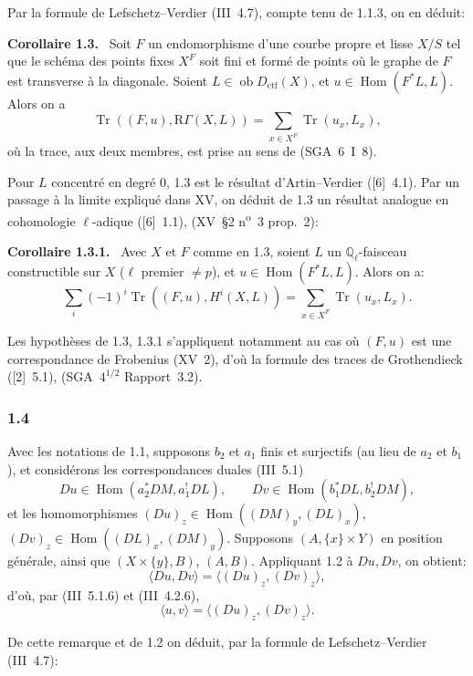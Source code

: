 \documentclass[11pt]{article}
\newenvironment{statement}[1]{\par\medskip\noindent\textbf{#1.}\ }{\par\medskip}
\DeclareMathOperator{\Hom}{Hom}
\newcommand{\R}{\mathrm{R}}\newcommand{\RHomCore}{\mathrm{RHom}}
\newcommand{\ob}{\operatorname{ob}}
\providecommand{\ctf}{\mathrm{ctf}}
\providecommand{\Tr}{\operatorname{Tr}}
\providecommand{\Tr}{\operatorname{Tr}}
\providecommand{\Tr}{\operatorname{Tr}}
\providecommand{\Hom}{\operatorname{Hom}}
\providecommand{\ob}{\operatorname{ob}}
\providecommand{\R}{\mathrm R}
\providecommand{\Tr}{\operatorname{Tr}}
\providecommand{\Hom}{\operatorname{Hom}}
\providecommand{\Tr}{\operatorname{Tr}}
\begin{document}
Par la formule de Lefschetz--Verdier (III~4.7), compte tenu de 1.1.3, on en déduit:

\begin{statement}{Corollaire 1.3}
Soit $F$ un endomorphisme d'une courbe propre et lisse $X/S$ tel que le schéma des points fixes $X^F$ soit fini et formé de points où le graphe de $F$ est transverse à la diagonale. Soient $L\in\ob D_{\ctf}(X)$, et $u\in\Hom(F^*L,L)$. Alors on a
\[
\Tr((F,u),\R\Gamma(X,L))=\sum_{x\in X^F}\Tr(u_x,L_x),
\]
où la trace, aux deux membres, est prise au sens de (SGA~6~I~8).
\end{statement}

Pour $L$ concentré en degré $0$, 1.3 est le résultat d'Artin--Verdier ([6]~4.1). Par un passage à la limite expliqué dans XV, on déduit de 1.3 un résultat analogue en cohomologie $\ell$-adique ([6]~1.1), (XV~\S2 n\textsuperscript{o}~3 prop.~2):

\begin{statement}{Corollaire 1.3.1}
Avec $X$ et $F$ comme en 1.3, soient $L$ un $\mathbb Q_\ell$-faisceau constructible sur $X$ ($\ell$ premier $\ne p$), et $u\in\Hom(F^*L,L)$. Alors on a:
\[
\sum_i(-1)^i\Tr((F,u),H^i(X,L))=\sum_{x\in X^F}\Tr(u_x,L_x).
\]
\end{statement}

Les hypothèses de 1.3, 1.3.1 s'appliquent notamment au cas où $(F,u)$ est une correspondance de Frobenius (XV~2), d'où la formule des traces de Grothendieck ([2]~5.1), (SGA~$4^{1/2}$ Rapport~3.2).

\subsubsection*{1.4}
Avec les notations de 1.1, supposons $b_2$ et $a_1$ finis et surjectifs (au lieu de $a_2$ et $b_1$), et considérons les correspondances duales (III~5.1)
\[
Du\in\Hom(a_2^*DM,a_1^!DL),\qquad Dv\in\Hom(b_1^*DL,b_2^!DM),
\]
et les homomorphismes $(Du)_z\in\Hom((DM)_y,(DL)_x)$, $(Dv)_z\in\Hom((DL)_x,(DM)_y)$. Supposons $(A,\{x\}\times Y)$ en position générale, ainsi que $(X\times\{y\},B)$, $(A,B)$. Appliquant 1.2 à $Du,Dv$, on obtient:
\[
\langle Du,Dv\rangle=\langle (Du)_z,(Dv)_z\rangle,
\]
d'où, par (III~5.1.6) et (III~4.2.6),
\begin{equation}\tag{1.4.1}
\langle u,v\rangle=\langle (Du)_z,(Dv)_z\rangle.
\end{equation}

De cette remarque et de 1.2 on déduit, par la formule de Lefschetz--Verdier (III~4.7):
\end{document}
